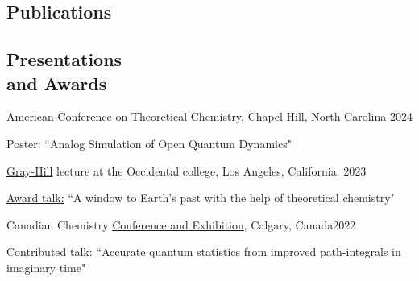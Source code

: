 \documentclass[margin,line]{res}
\newenvironment{list1}{
  \begin{list}{\ding{113}}{%
      \setlength{\itemsep}{0in}
      \setlength{\parsep}{0in} \setlength{\parskip}{0in}
      \setlength{\topsep}{0in} \setlength{\partopsep}{0in} 
      \setlength{\leftmargin}{0.17in}}}{\end{list}}
\begin{document}
\newpage

\pagestyle{headings}


\begin{resume}

\section{\sc Publications}


\end{resume}

\newpage

\pagestyle{headings}


\begin{resume}

\section{\sc Presentations \\and Awards}

American \href{https://www.actc2024.org/}{Conference} on Theoretical Chemistry, Chapel Hill, North Carolina \hfill{2024}

\begin{list1}
\item[]Poster: ``Analog Simulation of Open Quantum Dynamics"
\end{list1}

\vspace*{-2.5mm}

\href{https://www.oxy.edu/academics/student-research/urc/2023-summer-research-program}{Gray-Hill} lecture at the Occidental college, Los Angeles, California.  \hfill{2023}

\begin{list1}
\item[]\underline{Award talk:} ``A window to Earth's past with the help of theoretical chemistry"
\end{list1}

\vspace*{-2.5mm}

Canadian Chemistry \href{https://www.cheminst.ca/conference/canadian-chemistry-conference-and-exhibition/}{Conference and Exhibition}, Calgary, Canada\hfill {2022}

\begin{list1}
\item[]Contributed talk: ``Accurate quantum statistics from improved path-integrals in imaginary time" 
\end{list1}
\vspace*{-2.5mm}


\end{resume}
\end{document}
